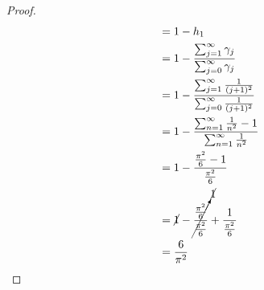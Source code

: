 \documentclass[
  coursecode={MTHE 455},
  assignmentname={Assignment \assignmentnumber},
  studentnumber=20053722,
  name={Bryan Hoang},
]{
  ltxanswer%
}
\begin{document}
\begin{questions}
\begin{solution}
\begin{proof}
\begin{align*}
                                     &= 1 - h_{1}                                                                                                     \\
                                     &= 1 - \frac{\sum_{j=1}^{\infty} \gamma_{j}}{\sum_{j=0}^{\infty} \gamma_{j}}                                     \\
                                     &= 1 - \frac{\sum_{j=1}^{\infty} \frac{1}{(j+1)^{2}}}{\sum_{j=0}^{\infty} \frac{1}{(j+1)^{2}}}                   \\
                                     &= 1 - \frac{\sum_{n=1}^{\infty} \frac{1}{n^{2}} - 1}{\sum_{n=1}^{\infty} \frac{1}{n^{2}}}                       \\
                                     &= 1 - \frac{\frac{\pi^{2}}{6} - 1}{\frac{\pi^{2}}{6}}                                                           \\
                                     &= \cancel{1} - \cancelto{\cancel{1}}{\frac{\frac{\pi^{2}}{6}}{\frac{\pi^{2}}{6}}} + \frac{1}{\frac{\pi^{2}}{6}} \\
                                     &= \frac{6}{\pi^{2}}
        \end{align*}
      \end{proof}
    \end{solution}
  \end{questions}
\end{document}
